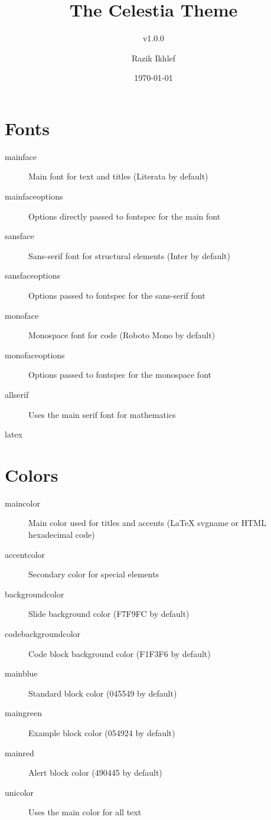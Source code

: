\documentclass[english]{neoschool}
\title{The Celestia Theme}
\subtitle{v1.0.0}
\author{Razik Ikhlef}
\date{\today}
\begin{document}
\maketitle

\section{Fonts}
\begin{description}
\item[mainface] Main font for text and titles (\textcolor{titleColor}{Literata} by default)
\item[mainfaceoptions] Options directly passed to \textcolor{titleColor}{fontspec} for the main font
\item[sansface] Sans-serif font for structural elements (\textcolor{titleColor}{Inter} by default)
\item[sansfaceoptions] Options passed to \textcolor{titleColor}{fontspec} for the sans-serif font
\item[monoface] Monospace font for code (\textcolor{titleColor}{Roboto Mono} by default)
\item[monofaceoptions] Options passed to \textcolor{titleColor}{fontspec} for the monospace font
\item[allserif] Uses the main serif font for mathematics
\end{description}

\begin{code}{latex}
\end{code}

\section{Colors}
\begin{description}
\item[maincolor] Main color used for titles and accents (\textcolor{titleColor}{LaTeX} svgname or \textcolor{titleColor}{HTML} hexadecimal code)
\item[accentcolor] Secondary color for special elements
\item[backgroundcolor] Slide background color (\textcolor{titleColor}{F7F9FC} by default)
\item[codebackgroundcolor] Code block background color (\textcolor{titleColor}{F1F3F6} by default)
\item[mainblue] Standard block color (\textcolor{titleColor}{045549} by default)
\item[maingreen] Example block color (\textcolor{titleColor}{054924} by default)
\item[mainred] Alert block color (\textcolor{titleColor}{490445} by default)
\item[unicolor] Uses the main color for all text
\end{description}
\end{document}
